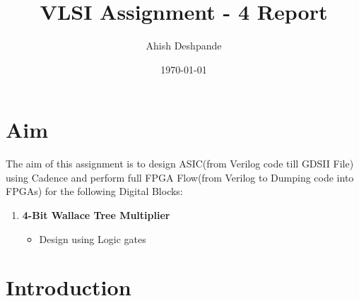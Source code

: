 \documentclass[a4paper,10pt]{report}
\begin{document}
\title{VLSI Assignment - 4 Report}
\author{Ahish Deshpande}
\date{\today}
\maketitle


\tableofcontents

\newpage

\renewcommand\thesection{\arabic{section}}
\section{Aim}

The aim of this assignment is to design ASIC(from Verilog code till GDSII File) using Cadence and perform full FPGA Flow(from Verilog to Dumping code into FPGAs) for the following Digital Blocks:
\begin{enumerate}

	\item \textbf{4-Bit Wallace Tree Multiplier}
		\begin{itemize}
			\item Design using Logic gates
		\end{itemize}


\end{enumerate}

\section{Introduction}
\end{document}
